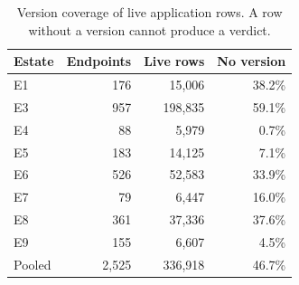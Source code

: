 \begin{table}[htbp]
\centering
\caption{Version coverage of live application rows. A row without a version cannot produce a verdict.}
\label{tab:version-coverage}
\footnotesize
\begin{tabular}{l r r r}
\hline
Estate & Endpoints & Live rows & No version \\
\hline
E1 & 176 & 15,006 & 38.2\% \\
E3 & 957 & 198,835 & 59.1\% \\
E4 & 88 & 5,979 & 0.7\% \\
E5 & 183 & 14,125 & 7.1\% \\
E6 & 526 & 52,583 & 33.9\% \\
E7 & 79 & 6,447 & 16.0\% \\
E8 & 361 & 37,336 & 37.6\% \\
E9 & 155 & 6,607 & 4.5\% \\
\hline
Pooled & 2,525 & 336,918 & 46.7\% \\
\hline
\end{tabular}
\end{table}
